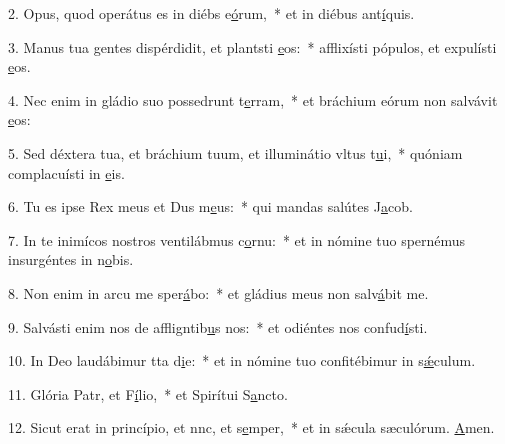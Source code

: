 2. Opus, quod operátus es in diébs e\uline{ó}rum,~* et in diébus ant\uline{í}quis.\par 
3. Manus tua gentes dispérdidit, et plantsti \uline{e}os:~* afflixísti pópulos, et expulísti \uline{e}os.\par 
4. Nec enim in gládio suo possedrunt t\uline{e}rram,~* et bráchium eórum non salvávit \uline{e}os:\par 
5. Sed déxtera tua, et bráchium tuum, et illuminátio vltus t\uline{u}i,~* quóniam complacuísti in \uline{e}is.\par 
6. Tu es ipse Rex meus et Dus m\uline{e}us:~* qui mandas salútes J\uline{a}cob.\par 
7. In te inimícos nostros ventilábmus c\uline{o}rnu:~* et in nómine tuo spernémus insurgéntes in n\uline{o}bis.\par 
8. Non enim in arcu me sper\uline{á}bo:~* et gládius meus non salv\uline{á}bit me.\par 
9. Salvásti enim nos de affligntib\uline{u}s nos:~* et odiéntes nos confud\uline{í}sti.\par 
10. In Deo laudábimur tta d\uline{i}e:~* et in nómine tuo confitébimur in s\uline{ǽ}culum.\par 
11. Glória Patr, et F\uline{í}lio,~* et Spirítui S\uline{a}ncto.\par 
12. Sicut erat in princípio, et nnc, et s\uline{e}mper,~* et in sǽcula sæculórum. \uline{A}men.\par 
